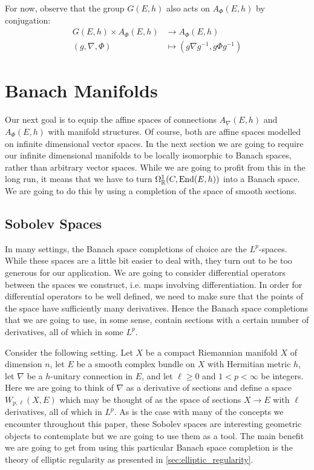 \documentclass[12pt]{ociamthesis}  %
\begin{document}
For now, observe that the group $G(E,h)$ also acts on $A_\Phi (E,h)$
by conjugation:
\begin{align*}
  G(E,h) \times A_\Phi (E,h) & \to A_\Phi (E,h)                        \\
  (g,\nabla,\Phi)            & \mapsto (g\nabla{g}^{-1},g\Phi{g}^{-1})
\end{align*}

\section{Banach Manifolds}

Our next goal is to equip the affine spaces of connections $A_\nabla(E,h)$
and $A_\Phi (E,h)$ with manifold structures. Of course, both are affine
spaces modelled on infinite dimensional vector spaces. In the next
section we are going to require our infinite dimensional manifolds to
be locally isomorphic to Banach spaces, rather than arbitrary
vector spaces. While we are going to profit from this in the long run,
it means that we have to turn $\Omega^1_{\mathbb{R}}(C,\operatorname{End}(E,h))$
into a Banach space. We are going to do this by using a completion of
the space of smooth sections.

\subsection{Sobolev Spaces}

In many settings, the Banach space completions of choice are the
$L^p$-spaces. While these spaces are a little bit easier to deal with,
they turn out to be too generous for our application. We are going to
consider differential operators between the spaces we construct,
i.e. maps involving differentiation. In order for differential operators
to be well defined, we need to make sure that the points of the space
have sufficiently many derivatives. Hence the Banach space completions
that we are going to use, in some sense, contain sections with a
certain number of derivatives, all of which in some $L^p$.

Consider the following setting. Let $X$ be a compact
Riemannian manifold $X$ of dimension $n$, let $E$ be a smooth complex
bundle on $X$ with Hermitian metric $h$, let $\nabla$ be a $h$-unitary
connection in $E$, and let $\ell\geq 0$ and $1<p<\infty$ be integers.
Here we are going to think of $\nabla$ as a derivative of sections and
define a space $W_{p,\ell}(X,E)$ which may be thought of as the space of
sections $X\to E$ with $\ell$ derivatives, all of which in $L^p$. As
is the case with many of the concepts we encounter throughout this paper,
these Sobolev spaces are interesting geometric objects to
contemplate but we are going to use them as a tool. The main
benefit we are going to get from using this particular Banach space
completion is the theory of elliptic regularity as presented in
\ref{sec:elliptic_regularity}.
\end{document}
